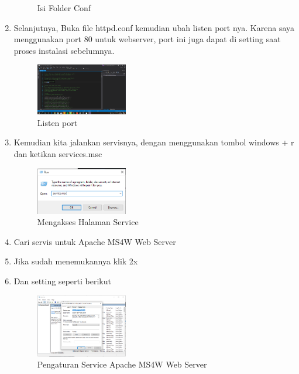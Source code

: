 \begin{enumerate}
\begin{figure}[H]
		\centering
		\caption{Isi Folder Conf}
    \end{figure}
  \item Selanjutnya, Buka file httpd.conf kemudian ubah listen port nya. Karena saya menggunakan port 80 untuk webserver, port ini juga dapat di setting saat proses instalasi sebelumnya.
  \hfill\break
    \begin{figure}[H]
		\includegraphics[width=4cm]{figures/tugas4/1174054/13.png}
		\centering
		\caption{Listen port}
    \end{figure}
  \item Kemudian kita jalankan servisnya, dengan menggunakan tombol windows + r dan ketikan services.msc
  \hfill\break
    \begin{figure}[H]
		\includegraphics[width=4cm]{figures/tugas4/1174054/14.png}
		\centering
		\caption{Mengakses Halaman Service}
    \end{figure}
  \item Cari servis untuk Apache MS4W Web Server
  \item Jika sudah menemukannya klik 2x
  \item Dan setting seperti berikut
  \hfill\break
    \begin{figure}[H]
		\includegraphics[width=4cm]{figures/tugas4/1174054/15.png}
		\centering
		\caption{Pengaturan Service Apache MS4W Web Server}
    \end{figure}
\end{enumerate}
